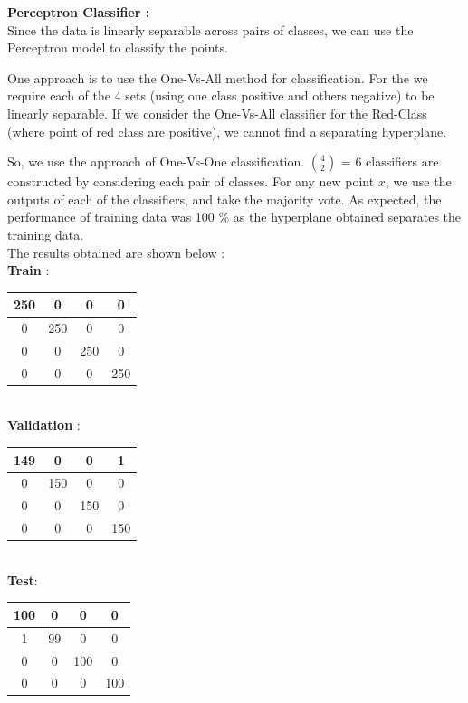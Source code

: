 \documentclass{article}
\begin{document}
\begin{flushleft}
\textbf{Perceptron Classifier :}  \\[10pt]

Since the data is linearly separable across pairs of classes, we can use the Perceptron model to classify the points. 

One approach is to use the One-Vs-All method for classification.  For the we require each of the 4 sets (using one class positive and others negative) to be linearly separable. If we consider the One-Vs-All classifier for the Red-Class (where point of red class are positive), we cannot find a separating hyperplane.

So, we use the approach of One-Vs-One classification.  $ 4 \choose 2 $ = 6 classifiers are constructed by considering each pair of classes. For any new point $x$, we use the outputs of each of the classifiers, and take the majority vote. As expected, the performance of training data was 100 \% as the hyperplane obtained separates the training data.  \\[10pt]

The results obtained are shown below  :\\[10pt]

\textbf{Train} : \\[10pt]


\begin{tabular}{|c|c|c|c|} \hline 250 & 0 & 0 & 0\\ \hline 0 & 250 & 0 & 0\\ \hline 0 & 0 & 250 & 0\\ \hline 0 & 0 & 0 & 250 \\ \hline \end{tabular} \\[10pt]

\textbf{Validation} : \\[10pt]

\begin{tabular}{|c|c|c|c|}  \hline 149 & 0 & 0 & 1\\ \hline 0 & 150 & 0 & 0\\ \hline 0 & 0 & 150 & 0\\ \hline 0 & 0 & 0 & 150 \\ \hline \end{tabular}  \\[10pt]


\textbf{Test}: \\[10pt]


\begin{tabular}{|c|c|c|c|}\hline 100 & 0 & 0 & 0\\ \hline 1 & 99 & 0 & 0\\ \hline 0 & 0 & 100 & 0\\ \hline 0 & 0 & 0 & 100 \\ \hline \end{tabular} \\[10pt]




\end{flushleft}
\end{document}
